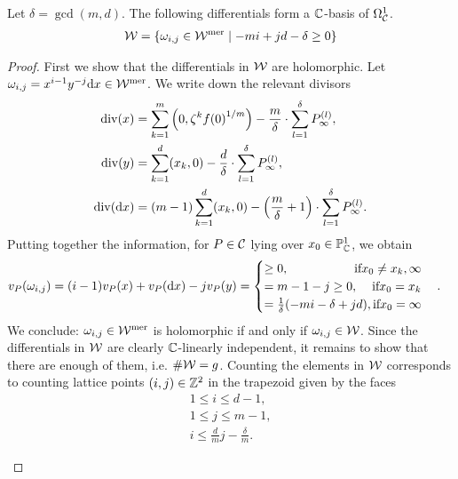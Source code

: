 \documentclass[main.tex]{subfiles}
\begin{document}
     \begin{prop}\label{prop:holom_diff}
 Let $\delta = \gcd(m,d)$. The following differentials form  a $\mathbb{C}$-basis of $\Omega^1_{\mathcal{C}}$.
 \begin{align}\label{eq:holm_diff}
   \mathcal{W} =  \left\{  \omega_{i,j} \in \mathcal{W}^{\text{mer}}  \mid  -mi + jd - \delta \ge 0  \right\}
 \end{align}
     \end{prop}
     \begin{proof}
      First we show that the differentials in $\mathcal{W}$ are holomorphic.
      Let $\omega_{i,j} = x^{i-1}y^{-j} \mathrm d x \in \mathcal{W}^{\text{mer}}$. We write down the relevant divisors
      \begin{align*}
       \operatorname{div}(x) & = \sum_{k=1}^m \left(0,\zeta^k{f(0)}^{1/m}\right) - \frac{m}{\delta} \cdot \sum_{l = 1}^{\delta} P_{\infty}^{(l)}, \\
       \operatorname{div}(y) & = \sum_{k = 1}^d (x_k,0) - \frac{d}{\delta} \cdot \sum_{l = 1}^{\delta}  P_{\infty}^{(l)}, \\
       \operatorname{div}(\mathrm d x) & = (m-1)\sum_{k = 1}^d (x_k,0) - \left(\frac{m}{\delta} + 1\right)\cdot \sum_{l = 1}^{\delta}  P_{\infty}^{(l)}.
      \end{align*}
     Putting together the information, for $P \in \mathcal{C}$ lying over $x_0 \in \mathbb{P}^1_{\mathbb{C}}$, we obtain
     \begin{align}\label{eq:diff_cases}
      v_P(\omega_{i,j}) & = (i-1) v_P(x) + v_P(\dx)  - j v_P(y) =
 \begin{cases}
  \ge 0, \hfill \text{if}  x_0 \ne x_k,\infty \\
  = m-1-j \ge 0 , \hfill \text{if}  x_0 = x_k \\
  = \frac{1}{\delta}(-mi-\delta+jd),\hfill \text{if}  x_0 = \infty
 \end{cases}.
     \end{align}
     We conclude: $\omega_{i,j} \in \mathcal{W}^{\text{mer}}$ is holomorphic if and only if $\omega_{i,j} \in \mathcal{W}$. \abstand
     Since the differentials in $\mathcal{W}$ are clearly $\mathbb{C}$-linearly independent, it remains to show that
     there are enough of them, i.e. $\#\mathcal{W} = g$. \abstand
     Counting the elements in $\mathcal{W}$ corresponds to counting lattice points $(i,j) \in \mathbb{Z}^2$ in the trapezoid given by the faces
     \begin{align*}
 1 \le i \le d-1,\\
 1 \le j \le m-1, \\
 i \le \frac{d}{m}j - \frac{\delta}{m}.
     \end{align*}
      \begin{figure}[H]

\end{figure}
\end{proof}
\end{document}
